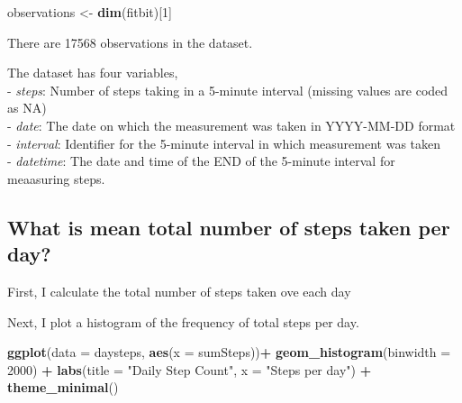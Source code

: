 \documentclass[]{article}
\newenvironment{Shaded}{\begin{snugshade}}{\end{snugshade}}
\newcommand{\KeywordTok}[1]{\textcolor[rgb]{0.13,0.29,0.53}{\textbf{#1}}}
\newcommand{\DataTypeTok}[1]{\textcolor[rgb]{0.13,0.29,0.53}{#1}}
\newcommand{\DecValTok}[1]{\textcolor[rgb]{0.00,0.00,0.81}{#1}}
\newcommand{\StringTok}[1]{\textcolor[rgb]{0.31,0.60,0.02}{#1}}
\newcommand{\OperatorTok}[1]{\textcolor[rgb]{0.81,0.36,0.00}{\textbf{#1}}}
\newcommand{\NormalTok}[1]{#1}
\begin{document}
\begin{Shaded}
\begin{Highlighting}[]
\NormalTok{observations <-}\StringTok{ }\KeywordTok{dim}\NormalTok{(fitbit)[}\DecValTok{1}\NormalTok{]}
\end{Highlighting}
\end{Shaded}

There are 17568 observations in the dataset.

The dataset has four variables,\\
- \emph{steps}: Number of steps taking in a 5-minute interval (missing
values are coded as NA)\\
- \emph{date}: The date on which the measurement was taken in YYYY-MM-DD
format\\
- \emph{interval}: Identifier for the 5-minute interval in which
measurement was taken\\
- \emph{datetime}: The date and time of the END of the 5-minute interval
for meaasuring steps.

\subsection{What is mean total number of steps taken per
day?}\label{what-is-mean-total-number-of-steps-taken-per-day}

First, I calculate the total number of steps taken ove each day

\begin{Shaded}
\end{Shaded}

Next, I plot a histogram of the frequency of total steps per day.

\begin{Shaded}
\begin{Highlighting}[]
\KeywordTok{ggplot}\NormalTok{(}\DataTypeTok{data =}\NormalTok{ daysteps, }\KeywordTok{aes}\NormalTok{(}\DataTypeTok{x =}\NormalTok{ sumSteps))}\OperatorTok{+}
\StringTok{      }\KeywordTok{geom_histogram}\NormalTok{(}\DataTypeTok{binwidth =} \DecValTok{2000}\NormalTok{) }\OperatorTok{+}
\StringTok{      }\KeywordTok{labs}\NormalTok{(}\DataTypeTok{title =} \StringTok{"Daily Step Count"}\NormalTok{, }\DataTypeTok{x =} \StringTok{"Steps per day"}\NormalTok{) }\OperatorTok{+}
\StringTok{      }\KeywordTok{theme_minimal}\NormalTok{()}
\end{Highlighting}
\end{Shaded}
\end{document}
